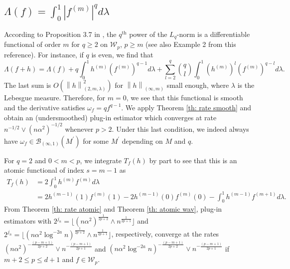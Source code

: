 \documentclass[preprint]{imsart}
\newcommand\norm[1]{\left\lVert#1\right\rVert}
\numberwithin{equation}{section}
\newcounter{cond}
\begin{document}
\subsection{$\Lambda(f)=\int_0^1|f^{(m)}|^qd\lambda$}

According to Proposition 3.7 in \cite{GoldsteinMesser92}, the $q^{\text{th}}$ power of the $L_q$-norm is a differentiable functional of order $m$ for $q\geq 2$ on $\mathcal{W}_{p}$, $p\geq m$ (see also Example 2 from this reference). For instance, if $q$ is even, we find that
\[\Lambda(f+h) = \Lambda(f) +q\int_0^1 h^{(m)}(f^{(m)})^{q-1}d\lambda + \sum_{l=2}^{q} \binom{q}{l}\int_0^1(h^{(m)})^l(f^{(m)})^{q-l}d\lambda.\]
The last sum is $O(\norm{h}^2_{(2,m,\lambda)})$ for $\norm{h}_{(\infty,m)}$ small enough, where $\lambda$ is the Lebesgue measure. Therefore, for $m=0$, we see that this functional is smooth and the derivative satisfies $\omega_f = qf^{q-1}$. We apply Theorem \ref{th: rate smooth} and obtain an (undersmoothed) plug-in estimator which converges at rate $n^{-1/2}\vee(n\alpha^2)^{-1/2}$ whenever $p> 2$. Under this last condition, we indeed always have $\omega_f\in\mathcal{B}_{(\infty,1)}(M^\prime)$ for some $M^\prime$ depending on $M$ and $q$.

For $q=2$ and $0<m<p$, we integrate $T_f(h)$ by part to see that this is an atomic functional of index $s=m-1$ as 
\begin{align*}
T_f(h) &= 2\int_0^1 h^{(m)}f^{(m)}d\lambda \\
&=  2h^{(m-1)}(1)f^{(m)}(1) - 2 h^{(m-1)}(0)f^{(m)}(0) - \int_0^1 h^{(m-1)}f^{(m+1)}d\lambda.
\end{align*}
From Theorem \ref{th: rate atomic} and Theorem \ref{th: atomic wav}, plug-in estimators with $2^{j_n} = \lfloor(n\alpha^2)^{\frac{1}{2p+2}}\wedge n^{\frac{1}{2p+1}}\rfloor$ and $2^{j_n} = \lfloor(n\alpha^2\log^{-2a} n)^{\frac{1}{2p+2}}\wedge n^{\frac{1}{2p+1}}\rfloor$, respectively, converge at the rates $(n\alpha^2)^{-\frac{(p-m+1)}{2p+2}}\vee n^{-\frac{(p-m+1)}{2p+1}}$ and $(n\alpha^2 \log^{-2a} n)^{-\frac{(p-m+1)}{2p+2}}\vee n^{-\frac{(p-m+1)}{2p+1}}$ if $m+2\leq p\leq d+1$ and $f\in\mathcal{W}_{p}$.
\end{document}
